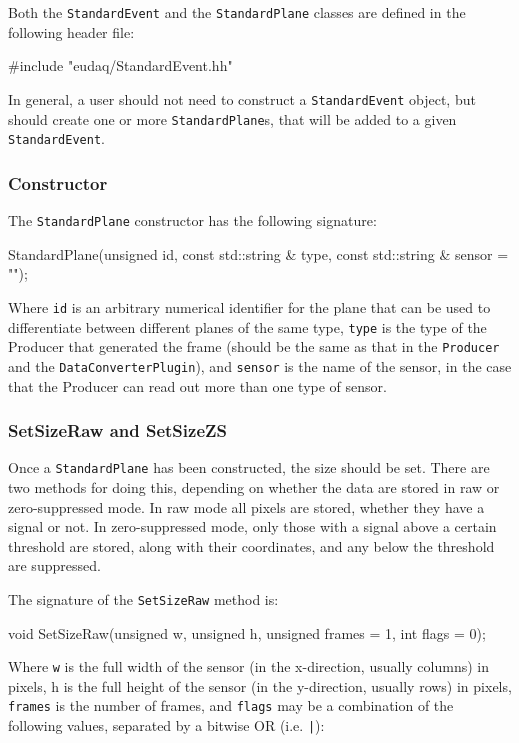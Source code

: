 Both the \texttt{StandardEvent} and the \texttt{StandardPlane} classes are defined in the following header file:
\begin{listing}
#include "eudaq/StandardEvent.hh"
\end{listing}

In general, a user should not need to construct a \texttt{StandardEvent} object,
but should create one or more \texttt{StandardPlane}s, that will be added to a given \texttt{StandardEvent}.

\subsubsection{Constructor}
The \texttt{StandardPlane} constructor has the following signature:
\begin{listing}
StandardPlane(unsigned id, const std::string & type,
              const std::string & sensor = "");
\end{listing}

Where \texttt{id} is an arbitrary numerical identifier for the plane
that can be used to differentiate between different planes of the same type,
\texttt{type} is the type of the Producer that generated the frame
(should be the same as that in the \texttt{Producer} and the \texttt{DataConverterPlugin}),
and \texttt{sensor} is the name of the sensor,
in the case that the Producer can read out more than one type of sensor.

\subsubsection{SetSizeRaw and SetSizeZS}
Once a \texttt{StandardPlane} has been constructed, the size should be set.
There are two methods for doing this,
depending on whether the data are stored in raw or zero-suppressed mode.
In raw mode all pixels are stored, whether they have a signal or not.
In zero-suppressed mode, only those with a signal above a certain threshold are stored,
along with their coordinates, and any below the threshold are suppressed.

The signature of the \texttt{SetSizeRaw} method is:
\begin{listing}
void SetSizeRaw(unsigned w, unsigned h, unsigned frames = 1, int flags = 0);
\end{listing}

Where \texttt{w} is the full width of the sensor (in the x-direction, usually columns) in pixels,
h is the full height of the sensor (in the y-direction, usually rows) in pixels, \texttt{frames} is the number of frames,
and \texttt{flags} may be a combination of the following values, separated by a bitwise OR (i.e. \texttt{|}):


